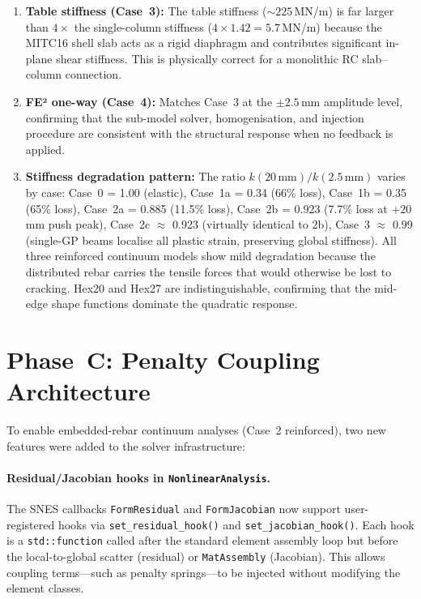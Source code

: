 \begin{enumerate}
  \item \textbf{Table stiffness (Case~3):}  The table stiffness
    ($\sim 225$\,MN/m) is far larger than $4 \times$ the single-column
    stiffness ($4 \times 1.42 = 5.7$\,MN/m) because the MITC16 shell
    slab acts as a rigid diaphragm and contributes significant
    in-plane shear stiffness.  This is physically correct for a
    monolithic RC slab--column connection.

  \item \textbf{FE² one-way (Case~4):} Matches Case~3 at the
    $\pm 2.5$\,mm amplitude level, confirming that the sub-model
    solver, homogenisation, and injection procedure are consistent
    with the structural response when no feedback is applied.

  \item \textbf{Stiffness degradation pattern:} The ratio
    $k(20\,\text{mm}) / k(2.5\,\text{mm})$ varies by case:
    Case~0 = 1.00 (elastic), Case~1a = 0.34 (66\% loss),
    Case~1b = 0.35 (65\% loss), Case~2a = 0.885 (11.5\% loss),
    Case~2b = 0.923 (7.7\% loss at $+20$\,mm push peak),
    Case~2c $\approx$ 0.923 (virtually identical to 2b),
    Case~3 $\approx$ 0.99
    (single-GP beams localise all plastic strain, preserving
    global stiffness).  All three reinforced continuum models show
    mild degradation because the distributed rebar carries the
    tensile forces that would otherwise be lost to cracking.
    Hex20 and Hex27 are indistinguishable, confirming that
    the mid-edge shape functions dominate the quadratic response.
\end{enumerate}


\section{Phase~C: Penalty Coupling Architecture}
\label{sec:cyclic-penalty-coupling}

To enable embedded-rebar continuum analyses (Case~2 reinforced),
two new features were added to the solver infrastructure:

\paragraph{Residual/Jacobian hooks in \texttt{NonlinearAnalysis}.}
The SNES callbacks \texttt{FormResidual} and \texttt{FormJacobian}
now support user-registered hooks via
\texttt{set\_residual\_hook()} and \texttt{set\_jacobian\_hook()}.
Each hook is a \texttt{std::function} called after the standard
element assembly loop but before the local-to-global scatter
(residual) or \texttt{MatAssembly} (Jacobian).  This allows
coupling terms---such as penalty springs---to be injected without
modifying the element classes.

